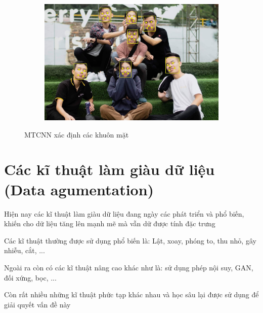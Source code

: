 \begin{figure}
    \begin{subfigure}{1.\textwidth}
        \begin{center}
            \includegraphics[width=1.\linewidth]{Chapters/items/chap2_14.jpg}
        \end{center}
        \label{fig: chap2_14}
    \end{subfigure}
    \caption{MTCNN xác định các khuôn mặt}
\end{figure}

\newpage
\section{Các kĩ thuật làm giàu dữ liệu (Data agumentation)}

Hiện nay các kĩ thuật làm giàu dữ liệu\cite{Augmentation} đang ngày các phát triển và phổ biến, khiến cho dữ liệu tăng lên
mạnh mẽ mà vẫn dữ được tính đặc trưng

Các kĩ thuật thường được sử dụng phổ biến là: Lật, xoay, phóng to, thu nhỏ, gây nhiễu, cắt, ...

Ngoài ra còn có các kĩ thuật nâng cao khác như là: sử dụng phép nội suy, GAN, đối xứng, bọc, ...

Còn rất nhiều những kĩ thuật phức tạp khác nhau và học sâu lại được sử dụng để giải quyết vấn đề này


